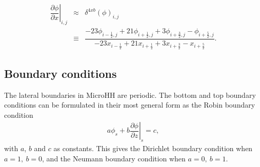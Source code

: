 \documentclass[gmd,manuscript]{copernicus}
\begin{document}
\begin{eqnarray}
\nonumber
\left. \dfrac{\partial \phi}{\partial x}\right|_{i,j} & \approx & \delta^{4xb} \left( \phi \right)_{i,j}\\
& \equiv & \dfrac{-23 \phi_{i-\frac{1}{2},j} + 21 \phi_{i+\frac{1}{2},j} + 3 \phi_{i+\frac{3}{2},j} - \phi_{i+\frac{5}{2},j}}
                 {-23    x_{i-\frac{1}{2}}   + 21    x_{i+\frac{1}{2}}   + 3    x_{i+\frac{3}{2}}   -    x_{i+\frac{5}{2}}}.\label{eq:grad_biased}
\end{eqnarray}



\subsection{Boundary conditions}
The lateral boundaries in MicroHH are periodic. The bottom and top boundary conditions can be formulated in their most general form as the Robin boundary condition
\begin{eqnarray}
a \phi_s + b \left.\dfrac{\partial \phi}{\partial z}\right|_s = c,
\end{eqnarray}
with $a$, $b$ and $c$ as constants. This gives the Dirichlet boundary condition when ${a=1,~b=0}$, and the Neumann boundary condition when ${a=0,~b=1}$. 
\end{document}
